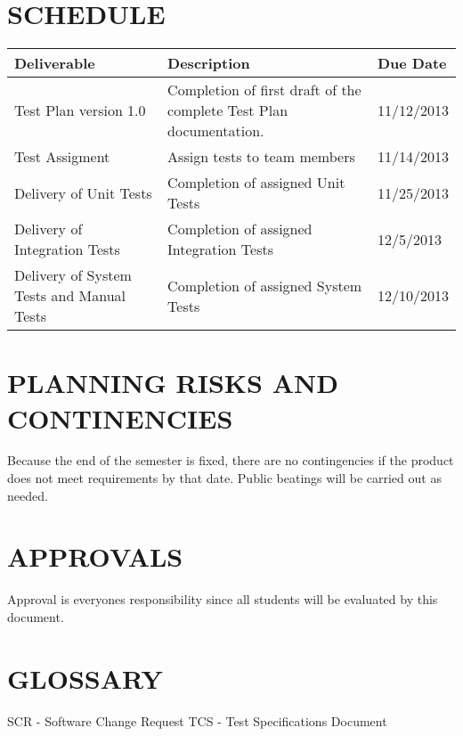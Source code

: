 \documentclass[report]{article}
\begin{document}
\section[SCHEDULE]{SCHEDULE}
\begin{center}
\begin{tabularx}{\textwidth}{| X | X | X |}
  \hline
  \textbf{Deliverable} &
  \textbf{Description} &
  \textbf{Due Date} 
\\ \hline
Test Plan version 1.0 & 
Completion of first draft of the complete Test Plan documentation. &
11/12/2013
\\ \hline

Test Assigment &
Assign tests to team members &
11/14/2013
\\ \hline

Delivery of Unit Tests &
Completion of assigned Unit Tests &
11/25/2013
\\ \hline

Delivery of Integration Tests &
Completion of assigned Integration Tests &
12/5/2013
\\ \hline

Delivery of System Tests and Manual Tests &
Completion of assigned System Tests &
12/10/2013
\\ \hline

\end{tabularx}
\end{center}

\section[PLANNING RISKS AND CONTINGENCIES]{PLANNING RISKS AND CONTINENCIES}
Because the end of the semester is fixed, there are no contingencies if the product does not meet requirements by that date. Public beatings will be carried out as needed.

\section[APPROVALS]{APPROVALS}

Approval is everyones responsibility since all students will be evaluated by this document.

\section[GLOSSARY]{GLOSSARY}
SCR - Software Change Request
TCS - Test Specifications Document
\end{document}
